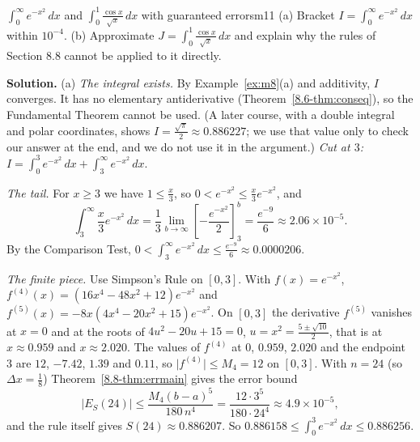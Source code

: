 \documentclass[11pt]{article}
\begin{document}
\begin{exmp}{$\displaystyle\int_0^\infty e^{-x^2}\,dx$ and $\displaystyle\int_0^1\frac{\cos x}{\sqrt x}\,dx$ with guaranteed errors}{m11}
(a) Bracket $I=\int_0^\infty e^{-x^2}\,dx$ within $10^{-4}$. (b) Approximate $J=\int_0^1\frac{\cos x}{\sqrt x}\,dx$ and explain why the rules of Section 8.8 cannot be applied to it directly.

\textbf{Solution.} (a) \emph{The integral exists.} By Example~\ref{ex:m8}(a) and additivity, $I$ converges. It has no elementary antiderivative (Theorem~\ref{8.6-thm:conseq}), so the Fundamental Theorem cannot be used. (A later course, with a double integral and polar coordinates, shows $I=\frac{\sqrt\pi}2\approx0.886227$; we use that value only to check our answer at the end, and we do not use it in the argument.) \emph{Cut at $3$:} $I=\int_0^3e^{-x^2}\,dx+\int_3^\infty e^{-x^2}\,dx$.

\emph{The tail.} For $x\ge3$ we have $1\le\frac x3$, so $0<e^{-x^2}\le\frac x3e^{-x^2}$, and
\[\int_3^\infty\frac x3e^{-x^2}\,dx=\frac13\lim_{b\to\infty}\left[-\frac{e^{-x^2}}2\right]_3^b=\frac{e^{-9}}6\approx2.06\times10^{-5}.\]
By the Comparison Test, $0<\int_3^\infty e^{-x^2}\,dx\le\frac{e^{-9}}6\approx0.0000206$.

\emph{The finite piece.} Use Simpson's Rule on $[0,3]$. With $f(x)=e^{-x^2}$, $f^{(4)}(x)=\left(16x^4-48x^2+12\right)e^{-x^2}$ and $f^{(5)}(x)=-8x\left(4x^4-20x^2+15\right)e^{-x^2}$. On $[0,3]$ the derivative $f^{(5)}$ vanishes at $x=0$ and at the roots of $4u^2-20u+15=0$, $u=x^2=\frac{5\pm\sqrt{10}}2$, that is at $x\approx0.959$ and $x\approx2.020$. The values of $f^{(4)}$ at $0$, $0.959$, $2.020$ and the endpoint $3$ are $12$, $-7.42$, $1.39$ and $0.11$, so $\lvert f^{(4)}\rvert\le M_4=12$ on $[0,3]$.
With $n=24$ (so $\Delta x=\frac18$) Theorem~\ref{8.8-thm:errmain} gives the error bound
\[\lvert E_S(24)\rvert\le\frac{M_4(b-a)^5}{180\,n^4}=\frac{12\cdot3^5}{180\cdot24^4}\approx4.9\times10^{-5},\]
and the rule itself gives $S(24)\approx0.886207$. So $0.886158\le\int_0^3e^{-x^2}\,dx\le0.886256$.


\end{exmp}
\end{document}
